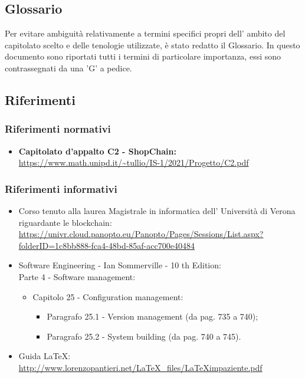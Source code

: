 \subsection{Glossario}
Per evitare ambiguità relativamente a termini specifici propri dell' ambito del capitolato scelto e delle tenologie utilizzate, è stato redatto il Glossario.
In questo documento sono riportati tutti i termini di particolare importanza, essi sono contrassegnati da una 'G' a pedice.
\subsection{Riferimenti}
\subsubsection{Riferimenti normativi}
\begin{itemize}
    \item \textbf{Capitolato d'appalto C2 - ShopChain:} \\
    \url{https://www.math.unipd.it/~tullio/IS-1/2021/Progetto/C2.pdf}
\end{itemize}
\subsubsection{Riferimenti informativi}
\begin {itemize}
    \item Corso tenuto alla laurea Magistrale in informatica dell' Università di Verona riguardante le blockchain\glo: \\
    \url{https://univr.cloud.panopto.eu/Panopto/Pages/Sessions/List.aspx?folderID=1c8bb888-fca4-48bd-85af-acc700e40484}
    
    \item Software Engineering - Ian Sommerville - 10 th Edition:\\
    Parte 4 - Software management:
    \begin{itemize}
        \item Capitolo 25 - Configuration management:
    
    \begin{itemize}
        \item Paragrafo 25.1 - Version management (da pag. 735 a 740);
        \item Paragrafo 25.2 - System building (da pag. 740 a 745).
    \end{itemize}
\end{itemize}
    \item Guida \LaTeX:\\
    \url{http://www.lorenzopantieri.net/LaTeX_files/LaTeXimpaziente.pdf}
\end{itemize}